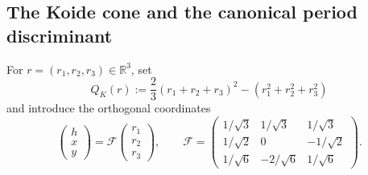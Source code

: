 \subsection{The Koide cone and the canonical period discriminant}
\label{koide-s6-subsection-ambient-discriminant}

For \(r=(r_1,r_2,r_3)\in\mathbb R^3\), set
\begin{equation}
 Q_K(r)
 :=\frac{2}{3}(r_1+r_2+r_3)^2-(r_1^2+r_2^2+r_3^2)
 \label{koide-s6-eq-koide-form}
\end{equation}
and introduce the orthogonal coordinates
\begin{equation}
 \begin{pmatrix}h\\x\\y\end{pmatrix}
 =\mathcal F\begin{pmatrix}r_1\\r_2\\r_3\end{pmatrix},
 \qquad
 \mathcal F=
 \begin{pmatrix}
  1/\sqrt3&1/\sqrt3&1/\sqrt3\\
  1/\sqrt2&0&-1/\sqrt2\\
  1/\sqrt6&-2/\sqrt6&1/\sqrt6
 \end{pmatrix}.
 \label{koide-s6-eq-orthogonal-coordinates}
\end{equation}

